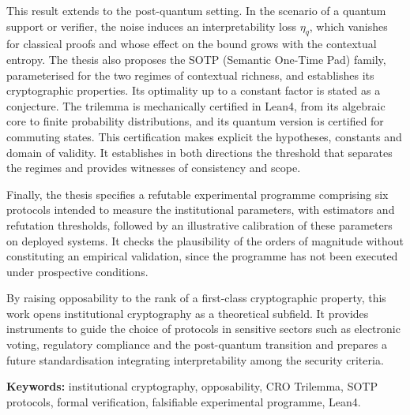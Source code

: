 \begin{sloppypar}
This result extends to the post-quantum setting. In the scenario of a
quantum support or verifier, the noise induces an interpretability loss $\eta_q$, which vanishes for
classical proofs and whose effect on the bound grows with the contextual
entropy. The thesis also proposes the SOTP (Semantic One-Time Pad) family,
parameterised for the two regimes of contextual richness, and
establishes its cryptographic properties. Its optimality up to a constant factor is
stated as a conjecture. The trilemma is mechanically certified in Lean4, from its algebraic core to
finite probability distributions, and its quantum version is certified for commuting states. This certification makes explicit the hypotheses,
constants and domain of validity. It establishes in both directions the threshold
that separates the regimes and provides witnesses of consistency and scope.

Finally, the thesis specifies a refutable experimental programme
comprising six protocols intended to measure the institutional parameters,
with estimators and refutation thresholds, followed by an illustrative calibration of
these parameters on deployed systems. It checks the plausibility of the
orders of magnitude without constituting an empirical validation, since
the programme has not been executed under prospective conditions.

By raising opposability to the rank of a first-class cryptographic
property, this work opens institutional cryptography as a
theoretical subfield. It provides instruments to guide the choice
of protocols in sensitive sectors such as electronic voting, regulatory
compliance and the post-quantum transition and prepares a future
standardisation integrating interpretability among the security criteria.

\vspace{0.5cm}
\noindent\textbf{Keywords:} institutional cryptography, opposability,
CRO Trilemma, SOTP protocols, formal verification, falsifiable experimental
programme, Lean4.

\end{sloppypar}